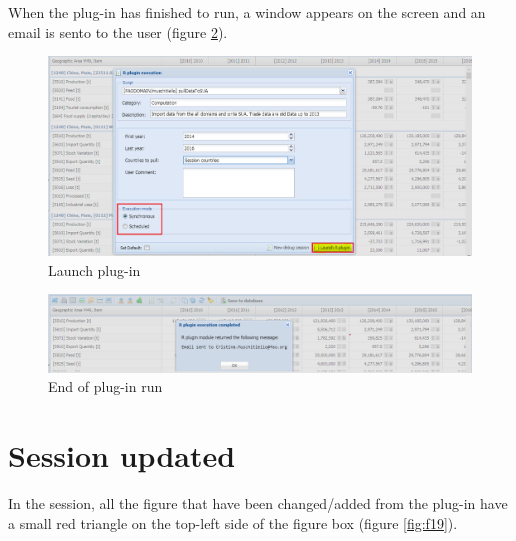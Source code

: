 \documentclass[]{article}
\begin{document}
When the plug-in has finished to run, a window appears on the screen and
an email is sento to the user (figure \ref{fig:f18}).

\begin{figure}[H]

{\centering \includegraphics[width=1\linewidth]{images/pullData/16_launch} 

}

\caption{\label{fig:f16}Launch plug-in}\label{fig:f16}
\end{figure}

\begin{figure}[H]

{\centering \includegraphics[width=1\linewidth]{images/pullData/18_emailSent} 

}

\caption{\label{fig:f18}End of plug-in run}\label{fig:f18}
\end{figure}

\section{Session updated}\label{session-updated}

In the session, all the figure that have been changed/added from the
plug-in have a small red triangle on the top-left side of the figure box
(figure \ref{fig:f19}).
\end{document}
